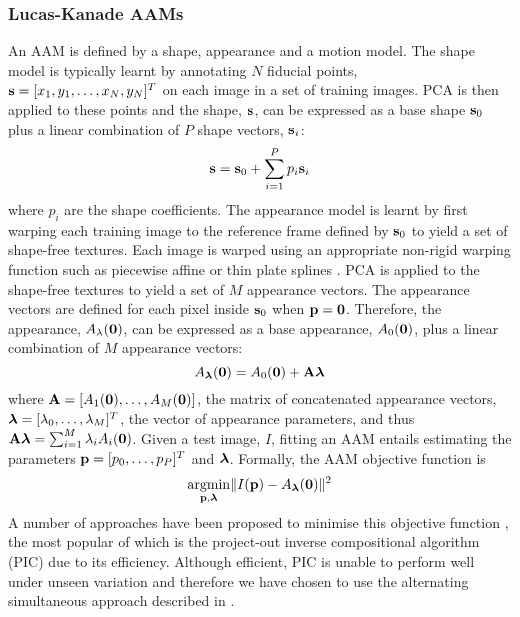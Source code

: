 \subsubsection{Lucas-Kanade AAMs}\label{subsubsec:2d-lk-aams}
An AAM is defined by a shape, appearance and a motion model. The shape model is
typically learnt by annotating $N$ fiducial points, $\boldsymbol{\mathbf{s}} = [x_1, y_1,
\ldots, x_N, y_N]^T$ on each image in a set of training images. PCA is then
applied to these points and the shape, $\boldsymbol{\mathbf{s}}$, can be expressed as a
base shape $\boldsymbol{\mathbf{s}}_0$ plus a linear combination of $P$ shape vectors,
$\boldsymbol{\mathbf{s}}_i$:
\begin{equation}\label{eq:aam-shape-model}
    \boldsymbol{\mathbf{s}} = \boldsymbol{\mathbf{s}}_0 + \sum^P_{i=1} p_i \boldsymbol{\mathbf{s}}_i
\end{equation}
where $p_i$ are the shape coefficients. The appearance model is learnt by first
warping each training image to the reference frame defined by $\boldsymbol{\mathbf{s}}_0$
to yield a set of shape-free textures. Each image is warped using an appropriate
non-rigid warping function such as piecewise affine \cite{cootes2001active} or thin
plate splines \cite{papandreou2008adaptive}. PCA is applied to the shape-free textures to
yield a set of $M$ appearance vectors. The appearance vectors are defined for
each pixel inside $\boldsymbol{\mathbf{s}}_0$ when $\boldsymbol{\mathbf{p}} = \boldsymbol{\mathbf{0}}$. Therefore, the
appearance, $A_\lambda(\boldsymbol{\mathbf{0}})$, can be expressed as a base appearance,
$A_0(\boldsymbol{\mathbf{0}})$, plus a linear combination of $M$ appearance vectors:
\begin{equation}\label{eq:aam-appearance-model}
    A_{\boldsymbol{\mathbf{\lambda}}}(\boldsymbol{\mathbf{0}}) = A_0(\boldsymbol{\mathbf{0}}) + \boldsymbol{\mathbf{A}} \boldsymbol{\mathbf{\lambda}}
\end{equation}
where $\boldsymbol{\mathbf{A}} = [A_1(\boldsymbol{\mathbf{0}}), \ldots, A_M(\boldsymbol{\mathbf{0}})]$, the matrix of
concatenated appearance vectors, $\boldsymbol{\mathbf{\lambda}} = [\lambda_0, \ldots, \lambda_M]^T$,
the vector of appearance parameters, and thus $\boldsymbol{\mathbf{A}} \boldsymbol{\mathbf{\lambda}} =
\sum^M_{i=1} \lambda_i A_i(\boldsymbol{\mathbf{0}})$. Given a test image, $I$, fitting an AAM
entails estimating the parameters $\boldsymbol{\mathbf{p}} = [p_0, \ldots, p_P]^T$ and $\boldsymbol{\mathbf{\lambda}}$.
Formally, the AAM objective function is
\begin{equation}\label{eq:aam-objective}
    \argmin_{\p,\blambda} \norm{I(\p) - A_{\blambda}(\zero)}^2
\end{equation}
A number of approaches have been proposed to minimise this objective function
\cite{gross2005generic,matthews2004active,papandreou2008adaptive}, the most popular of
which is the project-out inverse compositional algorithm (PIC)
\cite{cootes2001active,amberg2009compositional} due to its efficiency. Although efficient, PIC
is unable to perform well under unseen variation and therefore we have chosen to
use the alternating simultaneous approach described in \cite{matthews2004active}.
